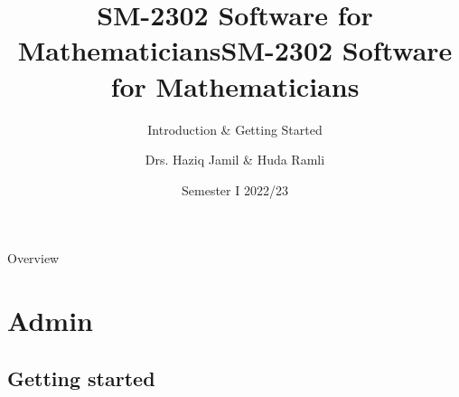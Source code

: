 \documentclass[,aspectratio=169]{beamer}
\author{Drs. Haziq Jamil \& Huda Ramli}
\title{SM-2302 Software for Mathematicians}
\title{SM-2302 Software for Mathematicians}
\subtitle{Introduction \& Getting Started}
\institute{Mathematical Sciences, Faculty of Science, UBD\\
\url{https://sm2302.github.io}}
\date{Semester I 2022/23}
\begin{document}
\begin{frame}
	\titlepage
\end{frame}

\begin{frame}[allowframebreaks=0.8]{Overview}
	\tableofcontents
\end{frame}

\hypertarget{admin}{%
\section{Admin}\label{admin}}

\hypertarget{getting-started}{%
\subsection{Getting started}\label{getting-started}}
\end{document}
